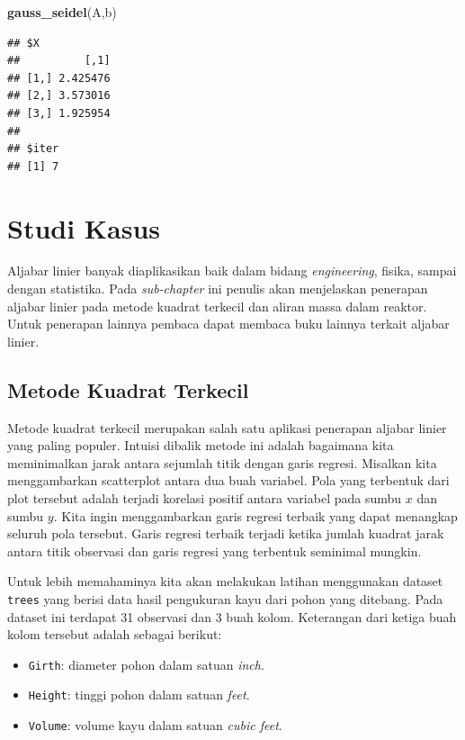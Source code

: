 \documentclass[]{book}
\newenvironment{Shaded}{\begin{snugshade}}{\end{snugshade}}
\newcommand{\KeywordTok}[1]{\textcolor[rgb]{0.13,0.29,0.53}{\textbf{#1}}}
\newcommand{\NormalTok}[1]{#1}
\providecommand{\tightlist}{%
  \setlength{\itemsep}{0pt}\setlength{\parskip}{0pt}}
\theoremstyle{definition}
\theoremstyle{definition}
\theoremstyle{definition}
\theoremstyle{remark}
\begin{document}
\begin{Shaded}
\begin{Highlighting}[]
\KeywordTok{gauss_seidel}\NormalTok{(A,b)}
\end{Highlighting}
\end{Shaded}

\begin{verbatim}
## $X
##          [,1]
## [1,] 2.425476
## [2,] 3.573016
## [3,] 1.925954
## 
## $iter
## [1] 7
\end{verbatim}

\hypertarget{studikasus}{%
\section{Studi Kasus}\label{studikasus}}

Aljabar linier banyak diaplikasikan baik dalam bidang \emph{engineering}, fisika, sampai dengan statistika. Pada \emph{sub-chapter} ini penulis akan menjelaskan penerapan aljabar linier pada metode kuadrat terkecil dan aliran massa dalam reaktor. Untuk penerapan lainnya pembaca dapat membaca buku lainnya terkait aljabar linier.

\hypertarget{leastsquare}{%
\subsection{Metode Kuadrat Terkecil}\label{leastsquare}}

Metode kuadrat terkecil merupakan salah satu aplikasi penerapan aljabar linier yang paling populer. Intuisi dibalik metode ini adalah bagaimana kita meminimalkan jarak antara sejumlah titik dengan garis regresi. Misalkan kita menggambarkan scatterplot antara dua buah variabel. Pola yang terbentuk dari plot tersebut adalah terjadi korelasi positif antara variabel pada sumbu \(x\) dan sumbu \(y\). Kita ingin menggambarkan garis regresi terbaik yang dapat menangkap seluruh pola tersebut. Garis regresi terbaik terjadi ketika jumlah kuadrat jarak antara titik observasi dan garis regresi yang terbentuk seminimal mungkin.

Untuk lebih memahaminya kita akan melakukan latihan menggunakan dataset \texttt{trees} yang berisi data hasil pengukuran kayu dari pohon yang ditebang. Pada dataset ini terdapat 31 observasi dan 3 buah kolom. Keterangan dari ketiga buah kolom tersebut adalah sebagai berikut:

\begin{itemize}
\tightlist
\item
  \texttt{Girth}: diameter pohon dalam satuan \emph{inch}.
\item
  \texttt{Height}: tinggi pohon dalam satuan \emph{feet}.
\item
  \texttt{Volume}: volume kayu dalam satuan \emph{cubic feet}.
\end{itemize}
\end{document}
